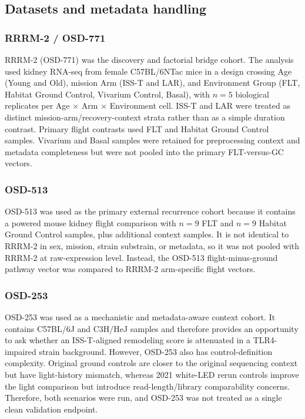 \documentclass[11pt]{article}
\begin{document}
\subsection{Datasets and metadata handling}

\subsubsection{RRRM-2 / OSD-771}

RRRM-2 (OSD-771) was the discovery and factorial bridge cohort. The analysis used kidney RNA-seq from female C57BL/6NTac mice in a design crossing Age (Young and Old), mission Arm (ISS-T and LAR), and Environment Group (FLT, Habitat Ground Control, Vivarium Control, Basal), with $n=5$ biological replicates per Age $\times$ Arm $\times$ Environment cell. ISS-T and LAR were treated as distinct mission-arm/recovery-context strata rather than as a simple duration contrast. Primary flight contrasts used FLT and Habitat Ground Control samples. Vivarium and Basal samples were retained for preprocessing context and metadata completeness but were not pooled into the primary FLT-versus-GC vectors.

\subsubsection{OSD-513}

OSD-513 was used as the primary external recurrence cohort because it contains a powered mouse kidney flight comparison with $n=9$ FLT and $n=9$ Habitat Ground Control samples, plus additional context samples. It is not identical to RRRM-2 in sex, mission, strain substrain, or metadata, so it was not pooled with RRRM-2 at raw-expression level. Instead, the OSD-513 flight-minus-ground pathway vector was compared to RRRM-2 arm-specific flight vectors.

\subsubsection{OSD-253}

OSD-253 was used as a mechanistic and metadata-aware context cohort. It contains C57BL/6J and C3H/HeJ samples and therefore provides an opportunity to ask whether an ISS-T-aligned remodeling score is attenuated in a TLR4-impaired strain background. However, OSD-253 also has control-definition complexity. Original ground controls are closer to the original sequencing context but have light-history mismatch, whereas 2021 white-LED rerun controls improve the light comparison but introduce read-length/library comparability concerns. Therefore, both scenarios were run, and OSD-253 was not treated as a single clean validation endpoint.
\end{document}
